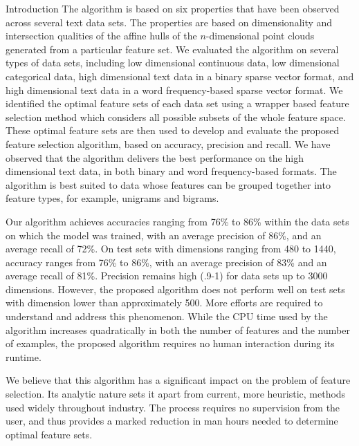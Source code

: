 \documentclass{llncs}
\begin{document}
\begin{section}{Introduction}
The algorithm is based on six properties that have been observed across several text data sets. The properties are based on dimensionality and intersection qualities of the affine hulls of the $n$-dimensional point clouds generated from a particular feature set. We evaluated the algorithm on several types of data sets, including low dimensional continuous data, low dimensional categorical data, high dimensional text data in a binary sparse vector format, and high dimensional text data in a word frequency-based sparse vector format. We identified the optimal feature sets of each data set using a wrapper based feature selection method which considers all possible subsets of the whole feature space. These optimal feature sets are then used to develop and evaluate the proposed feature selection algorithm, based on accuracy, precision and recall. We have observed that the algorithm delivers the  best performance on the high dimensional text data, in both binary and word frequency-based formats. The algorithm is best suited to data whose features can be grouped together into feature types, for example, unigrams and bigrams. 
	
Our algorithm achieves accuracies ranging from 76\% to 86\% within the data sets on which the model was trained, with an average precision of 86\%, and an average recall of 72\%. On test sets with dimensions ranging from 480 to 1440, accuracy ranges from 76\% to 86\%, with an average precision of 83\% and an average recall of 81\%. Precision remains high (.9-1) for data sets up to 3000 dimensions. However, the proposed algorithm does not perform well on test sets with dimension lower than approximately 500. More efforts are required to understand and address this phenomenon. While the CPU time used by the algorithm increases quadratically in both the number of features and the number of examples, the proposed algorithm requires no human interaction during its runtime. 

We believe that this algorithm has a significant impact on the problem of feature selection. Its analytic nature sets it apart from current, more heuristic, methods used widely throughout industry. The process requires no supervision from the user, and thus provides a marked reduction in man hours needed to determine optimal feature sets.
	 
\end{section}
\end{document}
